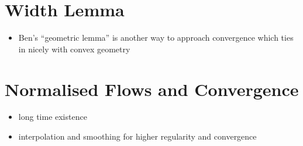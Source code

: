 \chapter{Width Lemma}

\begin{itemize}
\item Ben's ``geometric lemma'' is another way to approach convergence which ties in nicely with convex geometry
\end{itemize}

\chapter{Normalised Flows and Convergence}

\begin{itemize}
\item long time existence
\item interpolation and smoothing for higher regularity and convergence
\end{itemize}